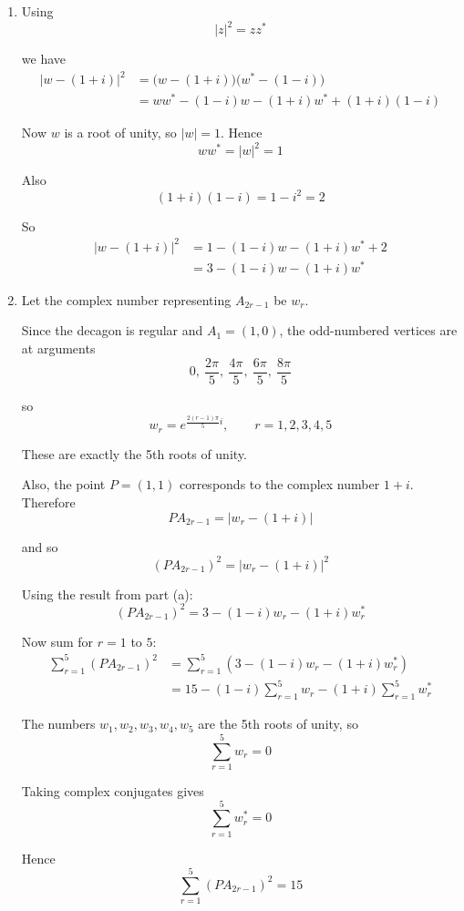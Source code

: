 \documentclass[leqno]{article}
\begin{document}
\begin{enumerate}[
  label=\textbf{\arabic*.},
  leftmargin=*,
  topsep=0pt,
  partopsep=0pt,
  parsep=0pt
]
\vspace*{10pt}

\begin{djsSolution}
\begin{enumerate}[label=\textbf{(\alph*)}]
  \item Using
\[
|z|^2=zz^*
\]

we have
\begin{align*}
|w-(1+i)|^2
&=\bigl(w-(1+i)\bigr)\bigl(w^*-(1-i)\bigr) \\
&=ww^*-(1-i)w-(1+i)w^*+(1+i)(1-i)
\end{align*}

Now $w$ is a root of unity, so $|w|=1$. Hence
\[
ww^*=|w|^2=1
\]

Also
\[
(1+i)(1-i)=1-i^2=2
\]

So
\begin{align*}
|w-(1+i)|^2
&=1-(1-i)w-(1+i)w^*+2 \\
&=3-(1-i)w-(1+i)w^*
\end{align*}

  \item Let the complex number representing $A_{2r-1}$ be $w_r$.

Since the decagon is regular and $A_1=(1,0)$, the odd-numbered vertices are at arguments
\[
0,\ \frac{2\pi}{5},\ \frac{4\pi}{5},\ \frac{6\pi}{5},\ \frac{8\pi}{5}
\]

so
\[
w_r=e^{\frac{2(r-1)\pi}{5}i},\qquad r=1,2,3,4,5
\]

These are exactly the 5th roots of unity.

Also, the point $P=(1,1)$ corresponds to the complex number $1+i$. Therefore
\[
PA_{2r-1}=|w_r-(1+i)|
\]

and so
\[
(PA_{2r-1})^2=|w_r-(1+i)|^2
\]

Using the result from part (a):
\[
(PA_{2r-1})^2=3-(1-i)w_r-(1+i)w_r^*
\]

Now sum for $r=1$ to $5$:
\begin{align*}
\sum_{r=1}^{5} (PA_{2r-1})^2
&=\sum_{r=1}^{5}\left(3-(1-i)w_r-(1+i)w_r^*\right) \\
&=15-(1-i)\sum_{r=1}^{5} w_r-(1+i)\sum_{r=1}^{5} w_r^*
\end{align*}

The numbers $w_1,w_2,w_3,w_4,w_5$ are the 5th roots of unity, so
\[
\sum_{r=1}^{5} w_r=0
\]

Taking complex conjugates gives
\[
\sum_{r=1}^{5} w_r^*=0
\]

Hence
\[
\sum_{r=1}^{5} (PA_{2r-1})^2=15
\]


\end{enumerate}
\end{djsSolution}
\end{enumerate}
\end{document}
